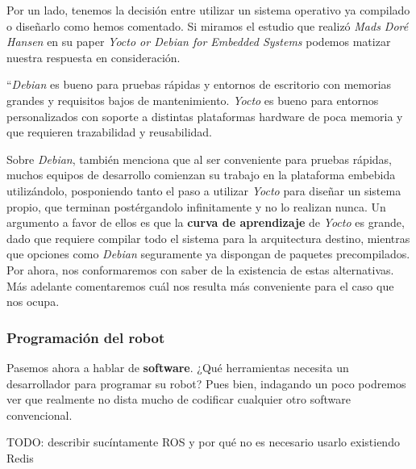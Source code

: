 Por un lado, tenemos la decisión entre utilizar un sistema operativo ya compilado o diseñarlo como hemos comentado. Si miramos el estudio que realizó \textit{Mads Doré Hansen} en su paper \textit{Yocto or Debian for Embedded Systems} \cite{yocto-or-debian} podemos matizar nuestra respuesta en consideración.

\begin{displayquote}
	``\textit{Debian} es bueno para pruebas rápidas y entornos de escritorio con memorias grandes y requisitos bajos de mantenimiento. \textit{Yocto} es bueno para entornos personalizados con soporte a distintas plataformas hardware de poca memoria y que requieren trazabilidad y reusabilidad.
\end{displayquote}

Sobre \textit{Debian}, también menciona que al ser conveniente para pruebas rápidas, muchos equipos de desarrollo comienzan su trabajo en la plataforma embebida utilizándolo, posponiendo tanto el paso a utilizar \textit{Yocto} para diseñar un sistema propio, que terminan postérgandolo infinitamente y no lo realizan nunca. Un argumento a favor de ellos es que la \textbf{curva de aprendizaje} de \textit{Yocto} es grande, dado que requiere compilar todo el sistema para la arquitectura destino, mientras que opciones como \textit{Debian} seguramente ya dispongan de paquetes precompilados.\\

Por ahora, nos conformaremos con saber de la existencia de estas alternativas. Más adelante comentaremos cuál nos resulta más conveniente para el caso que nos ocupa.\\


\subsubsection{Programación del robot}

Pasemos ahora a hablar de \textbf{software}. ¿Qué herramientas necesita un desarrollador para programar su robot? Pues bien, indagando un poco podremos ver que realmente no dista mucho de codificar cualquier otro software convencional.

TODO: describir sucíntamente ROS y por qué no es necesario usarlo existiendo Redis
